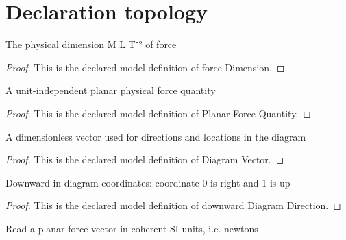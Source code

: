 \section{Declaration topology}
\begin{definition}
  \label{def:physics:phyx-mini-0681:phyxminiproblems-problemphyxmini0681-forcedimension}
  The physical dimension M L T⁻² of force
\end{definition}
\begin{proof}
  This is the declared model definition of force Dimension.
\end{proof}
\begin{definition}
  \label{def:physics:phyx-mini-0681:phyxminiproblems-problemphyxmini0681-planarforcequantity}
  A unit-independent planar physical force quantity
\end{definition}
\begin{proof}
  This is the declared model definition of Planar Force Quantity.
\end{proof}
\begin{definition}
  \label{def:physics:phyx-mini-0681:phyxminiproblems-problemphyxmini0681-diagramvector}
  A dimensionless vector used for directions and locations in the diagram
\end{definition}
\begin{proof}
  This is the declared model definition of Diagram Vector.
\end{proof}
\begin{definition}
  \label{def:physics:phyx-mini-0681:phyxminiproblems-problemphyxmini0681-downwarddiagramdirection}
  Downward in diagram coordinates: coordinate 0 is right and 1 is up
\end{definition}
\begin{proof}
  This is the declared model definition of downward Diagram Direction.
\end{proof}
\begin{definition}
  \label{def:physics:phyx-mini-0681:phyxminiproblems-problemphyxmini0681-forcevectorinnewtons}
  Read a planar force vector in coherent SI units, i.e. newtons
\end{definition}
